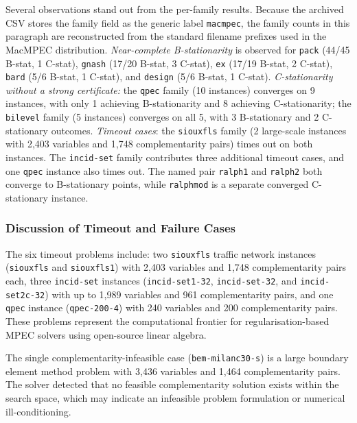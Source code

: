 Several observations stand out from the per-family results.
Because the archived CSV stores the family field as the generic label
\texttt{macmpec}, the family counts in this paragraph are reconstructed
from the standard filename prefixes used in the MacMPEC distribution.
\emph{Near-complete B-stationarity} is observed for \texttt{pack}
(44/45 B-stat, 1 C-stat), \texttt{gnash} (17/20 B-stat, 3 C-stat),
\texttt{ex} (17/19 B-stat, 2 C-stat), \texttt{bard} (5/6 B-stat,
1 C-stat), and \texttt{design} (5/6 B-stat, 1 C-stat).
\emph{C-stationarity without a strong certificate:} the \texttt{qpec}
family (10 instances) converges on 9 instances, with only 1 achieving
B-stationarity and 8 achieving C-stationarity; the \texttt{bilevel}
family (5 instances) converges on all 5, with 3 B-stationary and
2 C-stationary outcomes.
\emph{Timeout cases}: the \texttt{siouxfls} family (2 large-scale
instances with 2,403 variables and 1,748 complementarity pairs) times
out on both instances. The \texttt{incid-set} family contributes three
additional timeout cases, and one \texttt{qpec} instance also times out.
The named pair \texttt{ralph1}
and \texttt{ralph2} both converge to B-stationary points, while
\texttt{ralphmod} is a separate converged C-stationary instance.


\subsubsection{Discussion of Timeout and Failure Cases}
\label{sec:macmpec_failures}

The six timeout problems include:
two \texttt{siouxfls} traffic network instances (\texttt{siouxfls} and \texttt{siouxfls1})
with 2,403 variables and 1,748 complementarity pairs each,
three \texttt{incid-set} instances
(\texttt{incid-set1-32}, \texttt{incid-set-32}, and \texttt{incid-set2c-32})
with up to 1,989 variables and 961 complementarity pairs, and one
\texttt{qpec} instance (\texttt{qpec-200-4}) with 240 variables and
200 complementarity pairs.
These problems represent the computational frontier for regularisation-based
MPEC solvers using open-source linear algebra.

The single complementarity-infeasible case (\texttt{bem-milanc30-s}) is a
large boundary element method problem with 3,436 variables and 1,464
complementarity pairs.  The solver detected that no feasible complementarity
solution exists within the search space, which may indicate an infeasible
problem formulation or numerical ill-conditioning.

